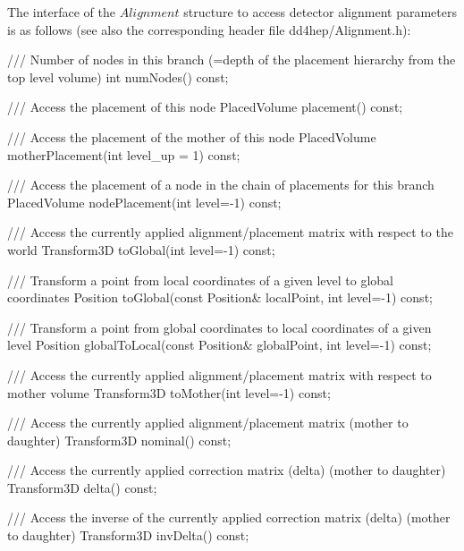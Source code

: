 \documentclass[10pt,a4paper]{article}
\begin{document}
\noindent
The interface of the $Alignment$ structure to access detector 
alignment parameters is as follows (see also the corresponding header file dd4hep/Alignment.h):
\begin{code}
      /// Number of nodes in this branch (=depth of the placement hierarchy from the top level volume)
      int numNodes() const;
      
      /// Access the placement of this node
      PlacedVolume placement()   const;

      /// Access the placement of the mother of this node
      PlacedVolume motherPlacement(int level_up = 1)   const;

      /// Access the placement of a node in the chain of placements for this branch
      PlacedVolume nodePlacement(int level=-1)   const;

      /// Access the currently applied alignment/placement matrix with respect to the world
      Transform3D toGlobal(int level=-1) const;

      /// Transform a point from local coordinates of a given level to global coordinates
      Position toGlobal(const Position& localPoint, int level=-1) const;

      /// Transform a point from global coordinates to local coordinates of a given level
      Position globalToLocal(const Position& globalPoint, int level=-1) const;

      /// Access the currently applied alignment/placement matrix with respect to mother volume
      Transform3D toMother(int level=-1) const;

      /// Access the currently applied alignment/placement matrix (mother to daughter)
      Transform3D nominal() const;

      /// Access the currently applied correction matrix (delta) (mother to daughter)
      Transform3D delta() const;

      /// Access the inverse of the currently applied correction matrix (delta) (mother to daughter)
      Transform3D invDelta() const;
\end{code}
\end{document}
